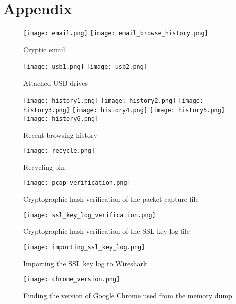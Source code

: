 \section{Appendix}

\begin{figure}[h]
    \centering
    \texttt{[image: email.png]}
    \texttt{[image: email\_browse\_history.png]}
    \caption{Cryptic email}
    \label{fig:email}
\end{figure}

\begin{figure}[h]
    \centering
    \texttt{[image: usb1.png]}
    \texttt{[image: usb2.png]}
    \caption{Attached USB drives}
    \label{fig:usb}
\end{figure}

\begin{figure}[h]
    \centering
    \texttt{[image: history1.png]}
    \texttt{[image: history2.png]}
    \texttt{[image: history3.png]}
    \texttt{[image: history4.png]}
    \texttt{[image: history5.png]}
    \texttt{[image: history6.png]}
    \caption{Recent browsing history}
    \label{fig:webhistory}
\end{figure}

\begin{figure}[h]
    \centering
    \texttt{[image: recycle.png]}
    \caption{Recycling bin}
    \label{recycle}
\end{figure}

\begin{figure}[h]
    \centering
    \texttt{[image: pcap\_verification.png]}
    \caption{Cryptographic hash verification of the packet capture file}
    \label{pcap_verification}
\end{figure}

\begin{figure}[h]
    \centering
    \texttt{[image: ssl\_key\_log\_verification.png]}
    \caption{Cryptographic hash verification of the SSL key log file}
    \label{ssl_key_log_verification}
\end{figure}

\begin{figure}[h]
    \centering
    \texttt{[image: importing\_ssl\_key\_log.png]}
    \caption{Importing the SSL key log to Wireshark}
    \label{importing_ssl_key_log}
\end{figure}

\begin{figure}[h]
    \centering
    \texttt{[image: chrome\_version.png]}
    \caption{Finding the version of Google Chrome used from the memory dump}
    \label{chrome_version}
\end{figure}
